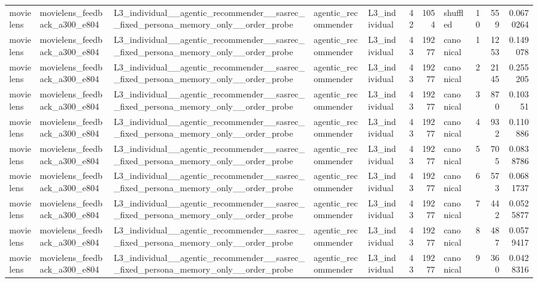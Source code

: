 \begin{table}[htbp!]
\begin{tabular}{lllllrrlrrr}
movielens & movielens\_feedback\_a300\_e804 & L3\_individual\_\_agentic\_recommender\_\_sasrec\_\_fixed\_persona\_memory\_only\_\_order\_probe & agentic\_recommender & L3\_individual & 42 & 1054 & shuffled & 10 & 559 & 0.0670264 \\
movielens & movielens\_feedback\_a300\_e804 & L3\_individual\_\_agentic\_recommender\_\_sasrec\_\_fixed\_persona\_memory\_only\_\_order\_probe & agentic\_recommender & L3\_individual & 43 & 19277 & canonical & 1 & 1253 & 0.149078 \\
movielens & movielens\_feedback\_a300\_e804 & L3\_individual\_\_agentic\_recommender\_\_sasrec\_\_fixed\_persona\_memory\_only\_\_order\_probe & agentic\_recommender & L3\_individual & 43 & 19277 & canonical & 2 & 2145 & 0.255205 \\
movielens & movielens\_feedback\_a300\_e804 & L3\_individual\_\_agentic\_recommender\_\_sasrec\_\_fixed\_persona\_memory\_only\_\_order\_probe & agentic\_recommender & L3\_individual & 43 & 19277 & canonical & 3 & 870 & 0.10351 \\
movielens & movielens\_feedback\_a300\_e804 & L3\_individual\_\_agentic\_recommender\_\_sasrec\_\_fixed\_persona\_memory\_only\_\_order\_probe & agentic\_recommender & L3\_individual & 43 & 19277 & canonical & 4 & 932 & 0.110886 \\
movielens & movielens\_feedback\_a300\_e804 & L3\_individual\_\_agentic\_recommender\_\_sasrec\_\_fixed\_persona\_memory\_only\_\_order\_probe & agentic\_recommender & L3\_individual & 43 & 19277 & canonical & 5 & 705 & 0.0838786 \\
movielens & movielens\_feedback\_a300\_e804 & L3\_individual\_\_agentic\_recommender\_\_sasrec\_\_fixed\_persona\_memory\_only\_\_order\_probe & agentic\_recommender & L3\_individual & 43 & 19277 & canonical & 6 & 573 & 0.0681737 \\
movielens & movielens\_feedback\_a300\_e804 & L3\_individual\_\_agentic\_recommender\_\_sasrec\_\_fixed\_persona\_memory\_only\_\_order\_probe & agentic\_recommender & L3\_individual & 43 & 19277 & canonical & 7 & 442 & 0.0525877 \\
movielens & movielens\_feedback\_a300\_e804 & L3\_individual\_\_agentic\_recommender\_\_sasrec\_\_fixed\_persona\_memory\_only\_\_order\_probe & agentic\_recommender & L3\_individual & 43 & 19277 & canonical & 8 & 487 & 0.0579417 \\
movielens & movielens\_feedback\_a300\_e804 & L3\_individual\_\_agentic\_recommender\_\_sasrec\_\_fixed\_persona\_memory\_only\_\_order\_probe & agentic\_recommender & L3\_individual & 43 & 19277 & canonical & 9 & 360 & 0.0428316 \\

\end{tabular}
\end{table}

